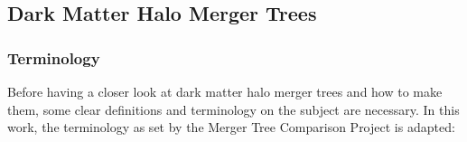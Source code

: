 \subsection{Dark Matter Halo Merger Trees}

\subsubsection{Terminology}

Before having a closer look at dark matter halo merger trees and how to make them, some clear definitions and terminology on the subject are necessary.
In this work, the terminology as set by the Merger Tree Comparison Project \parencite{SUSSING_COMPARISON} is adapted:

